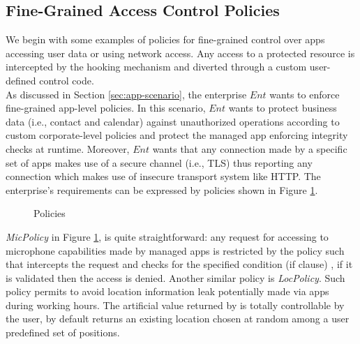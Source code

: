 \subsection{Fine-Grained Access Control Policies}
\label{sec:finepolicy}
We begin with some examples of policies for fine-grained control over apps accessing user data or using network access. Any  access to a protected resource is intercepted by the hooking mechanism and diverted through a custom user-defined control code. \\
As discussed in Section \ref{sec:app-scenario}, the enterprise $Ent$ wants to enforce fine-grained app-level policies. In this scenario, $Ent$ wants to protect business data (i.e., contact and calendar) against unauthorized operations according to custom corporate-level policies and protect the managed app enforcing integrity checks at runtime. Moreover, $Ent$ wants that any connection made by a specific set of apps makes use of a secure channel (i.e., TLS) thus reporting any connection which makes use of insecure transport system like HTTP. The enterprise's requirements can be expressed by policies shown in Figure \ref{fig:policies}. \\

\begin{figure}[ht!]
\centering

\caption{\asd Policies}
\label{fig:policies}
\end{figure}

\textit{MicPolicy} in Figure \ref{fig:policies}, is quite straightforward: any request for accessing to microphone capabilities made by managed apps is restricted by the policy such that \asd intercepts the request and checks for the specified condition (if clause) , if it is validated then the access is denied. Another similar policy is \textit{LocPolicy}. Such policy permits to avoid location information leak potentially made via apps during working hours. The artificial value returned by \asd is totally controllable by the user, by default \asd returns an existing location chosen at random among a user predefined set of positions.


